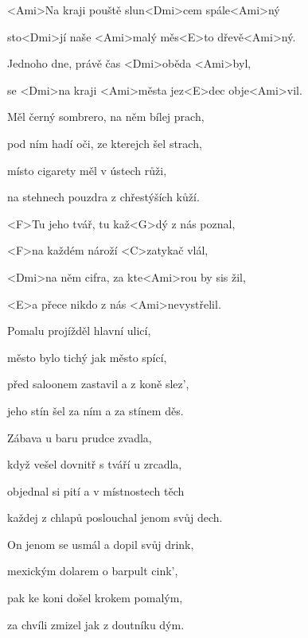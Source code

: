 

\zs
<Ami>Na kraji pouště slun<Dmi>cem spále<Ami>ný

sto<Dmi>jí naše <Ami>malý měs<E>to dřevě<Ami>ný.

Jednoho dne, právě čas <Dmi>oběda <Ami>byl,

se <Dmi>na kraji <Ami>města jez<E>dec obje<Ami>vil.
\ks

\zs
Měl černý sombrero, na něm bílej prach,

pod ním hadí oči, ze kterejch šel strach,

místo cigarety měl v ústech růži,

na stehnech pouzdra z chřestýších kůží.
\ks

\zr
<F>Tu jeho tvář, tu kaž<G>dý z nás poznal,

<F>na každém nároží <C>zatykač vlál,

<Dmi>na něm cifra, za kte<Ami>rou by sis žil,

<E>a přece nikdo z nás <Ami>nevystřelil.
\kr

\zs
Pomalu projížděl hlavní ulicí,

město bylo tichý jak město spící,

před saloonem zastavil a z koně slez',

jeho stín šel za ním a za stínem děs.
\ks

\zs
Zábava u baru prudce zvadla,

když vešel dovnitř s tváří u zrcadla,

objednal si pití a v místnostech těch

každej z chlapů poslouchal jenom svůj dech.
\ks

\zr \kr

\zs
On jenom se usmál a dopil svůj drink,

mexickým dolarem o barpult cink',

pak ke koni došel krokem pomalým,

za chvíli zmizel jak z doutníku dým.
\ks

\kp







